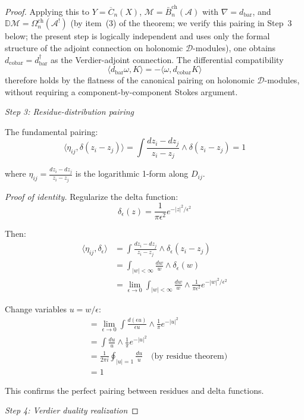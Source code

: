 \begin{proof}
Applying this to $Y = \overline{C}_n(X)$, $\mathcal{M} = \bar{B}^{\mathrm{ch}}_n(\mathcal{A})$ with $\nabla = d_{\mathrm{bar}}$, and $\mathbb{D}\mathcal{M} = \Omega^{\mathrm{ch}}_n(\mathcal{A}^!)$ (by item~(3) of the theorem; we verify this pairing in Step~3 below; the present step is logically independent and uses only the formal structure of the adjoint connection on holonomic $\mathcal{D}$-modules), one obtains $d_{\mathrm{cobar}} = d_{\mathrm{bar}}^\dagger$ as the Verdier-adjoint connection.  The differential compatibility
\[\langle d_{\text{bar}}\omega, K \rangle = -\langle \omega, d_{\text{cobar}}K \rangle\]
therefore holds by the flatness of the canonical pairing on holonomic $\mathcal{D}$-modules, without requiring a component-by-component Stokes argument.

\emph{Step 3: Residue-distribution pairing}

The fundamental pairing:
\[\langle \eta_{ij}, \delta(z_i - z_j) \rangle = \int \frac{dz_i - dz_j}{z_i - z_j} 
\wedge \delta(z_i - z_j) = 1\]

where $\eta_{ij} = \frac{dz_i - dz_j}{z_i - z_j}$ is the logarithmic 1-form along 
$D_{ij}$.

\emph{Proof of identity.} Regularize the delta function:
\[\delta_\epsilon(z) = \frac{1}{\pi \epsilon^2} e^{-|z|^2/\epsilon^2}\]

Then:
\begin{align*}
\langle \eta_{ij}, \delta_\epsilon \rangle &= \int \frac{dz_i - dz_j}{z_i - z_j} 
\wedge \delta_\epsilon(z_i - z_j) \\
&= \int_{|w| < \infty} \frac{dw}{w} \wedge \delta_\epsilon(w) \\
&= \lim_{\epsilon \to 0} \int_{|w| < \infty} \frac{dw}{w} \wedge \frac{1}{\pi \epsilon^2} 
e^{-|w|^2/\epsilon^2}
\end{align*}

Change variables $u = w/\epsilon$:
\begin{align*}
&= \lim_{\epsilon \to 0} \int \frac{d(\epsilon u)}{\epsilon u} \wedge \frac{1}{\pi} 
e^{-|u|^2} \\
&= \int \frac{du}{u} \wedge \frac{1}{\pi} e^{-|u|^2} \\
&= \frac{1}{2\pi i} \oint_{|u|=1} \frac{du}{u} \quad \text{(by residue theorem)} \\
&= 1
\end{align*}

This confirms the perfect pairing between residues and delta functions.

\emph{Step 4: Verdier duality realization}


\end{proof}
